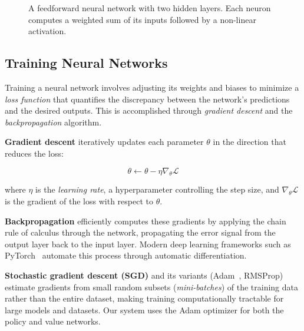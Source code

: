 \begin{figure}[H]
    \centering
    \caption{A feedforward neural network with two hidden layers. Each neuron computes a weighted sum of its inputs followed by a non-linear activation.}
    \label{fig:neural-network}
\end{figure}

\subsection{Training Neural Networks}

Training a neural network involves adjusting its weights and biases to minimize a \textit{loss function} that quantifies the discrepancy between the network's predictions and the desired outputs. This is accomplished through \textit{gradient descent} and the \textit{backpropagation} algorithm.

\textbf{Gradient descent} iteratively updates each parameter $\theta$ in the direction that reduces the loss:

\begin{equation}
    \theta \leftarrow \theta - \eta \nabla_\theta \mathcal{L}
\end{equation}

where $\eta$ is the \textit{learning rate}, a hyperparameter controlling the step size, and $\nabla_\theta \mathcal{L}$ is the gradient of the loss with respect to $\theta$.

\textbf{Backpropagation} efficiently computes these gradients by applying the chain rule of calculus through the network, propagating the error signal from the output layer back to the input layer. Modern deep learning frameworks such as PyTorch~\cite{paszke2019pytorch} automate this process through automatic differentiation.

\textbf{Stochastic gradient descent (SGD)} and its variants (Adam~\cite{kingma2014adam}, RMSProp) estimate gradients from small random subsets (\textit{mini-batches}) of the training data rather than the entire dataset, making training computationally tractable for large models and datasets. Our system uses the Adam optimizer for both the policy and value networks.

